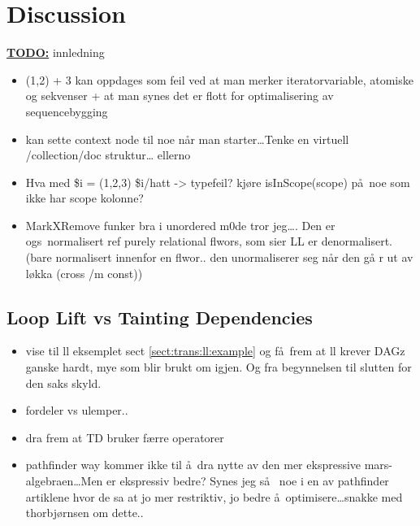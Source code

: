 \chapter{Discussion}
\label{chapter:discussion}

\textbf{\underline{\LARGE TODO:}} innledning

\begin{itemize}
  \item (1,2) + 3 kan oppdages som feil ved at man merker iteratorvariable, atomiske og sekvenser + at man synes
  det er flott for optimalisering av sequencebygging
  \item kan sette context node til noe n\aa r man starter\ldots Tenke en virtuell /collection/doc struktur\ldots
  ellerno
	\item Hva med \$i = (1,2,3) \$i/hatt -> typefeil? kj\o re isInScope(scope) p\aa~noe som ikke har scope kolonne?
	\item MarkXRemove funker bra i unordered m0de tror jeg\ldots. Den er ogs\a~normalisert ref purely relational
	flwors, som sier LL er denormalisert. (bare normalisert innenfor en flwor.. den unormaliserer seg n\aa r den g\aa
	r ut av l\o kka (cross /m const))
\end{itemize}

\section{Loop Lift vs Tainting Dependencies}
\label{sect:disc:llvsmXr}
\begin{itemize}
  \item vise til ll eksemplet sect \ref{sect:trans:ll:example} og f\aa~frem at ll krever DAGz ganske hardt,
  mye som blir brukt om igjen. Og fra begynnelsen til slutten for den saks skyld.
  \item fordeler vs ulemper..
  \item dra frem at TD bruker f\ae rre operatorer
  \item pathfinder way kommer ikke til \aa~dra nytte av den mer ekspressive mars-algebraen\ldots Men er ekspressiv
	  bedre? Synes jeg s\aa~ noe i en av pathfinder artiklene hvor de sa at jo mer restriktiv, jo bedre
	  \aa~optimisere\ldots snakke med thorbj\o rnsen om dette..
\end{itemize}

